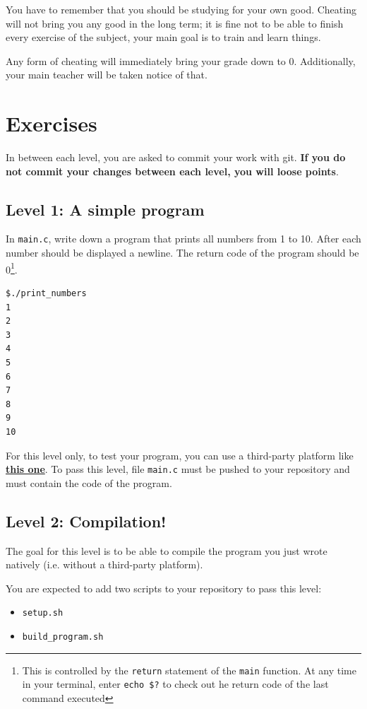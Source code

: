 \documentclass[12pt]{article}
\let\oldhref\href
\renewcommand{\href}[2]{\oldhref{#1}{\bfseries#2}}
\begin{document}
You have to remember that you should be studying for your own good. Cheating will not bring you any good in the long term; it is fine not to be able to finish every exercise of the subject, your main goal is to train and learn things.

Any form of cheating will immediately bring your grade down to 0. Additionally, your main teacher will be taken notice of that.

\section{Exercises}

In between each level, you are asked to commit your work with git. \textbf{If you do not commit your changes between each level, you will loose points}.

\subsection{Level 1: A simple program}

In \texttt{main.c}, write down a program that prints all numbers from 1 to 10. After each number should be displayed a newline.
The return code of the program should be 0\footnote{This is controlled by the \texttt{return} statement of the \texttt{main} function. At any time in your terminal, enter \texttt{echo \$?} to check out he return code of the last command executed}.

\begin{lstlisting}[language=bash]
$./print_numbers
1
2
3
4
5
6
7
8
9
10
\end{lstlisting}

For this level only, to test your program, you can use a third-party platform like \href{https://www.onlinegdb.com/online\_c\_compiler}{this one}. To pass this level, file \texttt{main.c} must be pushed to your repository and must contain the code of the program.

\subsection{Level 2: Compilation!}

The goal for this level is to be able to compile the program you just wrote natively (i.e. without a third-party platform).

You are expected to add two scripts to your repository to pass this level:
\begin{itemize}
	\item \texttt{setup.sh}
	\item \texttt{build\_program.sh}
\end{itemize}
\end{document}
